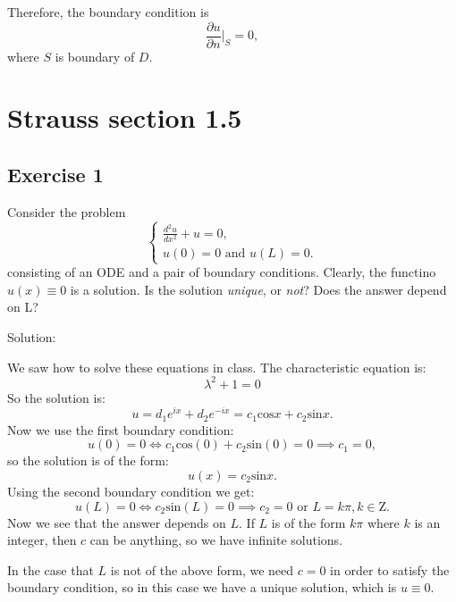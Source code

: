 \documentclass{article}
\begin{document}
		Therefore, the boundary condition is \[ \frac{\partial u}{\partial n}|_{S}=0,\]
		where $S$ is boundary of $D$.

\section{Strauss section 1.5}
\subsection{Exercise 1}
Consider the problem
		\begin{equation*}
			\begin{cases}
				\frac{d^2u}{dx^2}+u = 0,
				\\
				u(0)=0 \text{ and } u(L)=0.
			\end{cases}
		\end{equation*}
		consisting of an ODE and a pair of boundary
		conditions. Clearly, the functino $u(x) \equiv 0$ is a
		solution. Is the solution \textit{unique}, or \textit{not}?
	Does the answer depend on L?

		Solution:

		We saw how to solve these equations in class.
		The characteristic equation is:
		\[
			\lambda^2 +1=0
		\]
		So the solution is:
\[u = d_1e^{ix} + d_2e^{-ix} = c_1\text{cos}x +	c_2\text{sin}x.\]
		Now we use the first boundary condition:
		\[
			u(0)=0 \iff c_1\text{cos}(0) +
			c_2\text{sin}(0) = 0 \implies c_1=0,
	        \]
		so the solution is of the form:
		\[
			u(x)=c_{2}\text{sin}x.
		\]
		Using the second boundary condition we get:
		\[
			u(L)=0 \iff c_{2}\text{sin}(L) =0 \implies c_{2}=0 \text{ or } L=k\pi, k\in \mathrm{Z}.
		\]
		Now we see that the answer depends on $L$. If $L$ is of the form $k\pi$ where $k$ is an integer, then $c$ can be anything, so we have infinite solutions.

		In the case that $L$ is not of the above form, we need $c=0$
		in order to satisfy the boundary condition, so in
		this case we have a unique solution, which is $u
		\equiv 0$.
		
\end{document}
